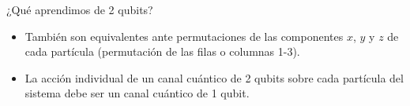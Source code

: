 \documentclass[11pt,xcolor=dvipsnames]{beamer}
\begin{document}
\begin{frame}{\Large ¿Qué aprendimos de 2 qubits?}
\begin{itemize}[label=$\textcolor{Blue}{\blacktriangleright}$]
		\item<5-> También son equivalentes ante permutaciones de las 
							componentes $x$, $y$ y $z$ de cada partícula 
							(permutación de las filas o columnas 1-3).
		\item<6-> La acción individual de un canal cuántico de 2 qubits sobre 
							cada partícula del sistema debe ser un canal cuántico de 1 qubit.	
	\end{itemize}
\end{frame}
\end{document}
